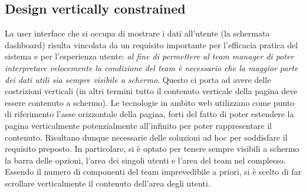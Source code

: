 \subsection{Design vertically constrained}
La user interface che si occupa di mostrare i dati all'utente (la schermata dashboard) risulta vincolata da un requisito importante per l'efficacia pratica del sistema e per l'esperienza utente: \emph{al fine di permettere al team manager di poter interpretare velocemente la condizione del team è necessario che la maggior parte dei dati utili sia sempre visibile a schermo}.\newline
Questo ci porta ad avere delle costrizioni verticali (in altri termini tutto il contenuto verticale della pagina deve essere contenuto a schermo).\newline
Le tecnologie in ambito web utilizzano come punto di riferimento l'asse orizzontale della pagina, forti del fatto di poter estendere la pagina verticalmente potenzialmente all'infinito per poter rappresentare il contenuto.\newline
Risultano dunque necessarie delle soluzioni ad hoc per soddisfare il requisito preposto.\newline
In particolare, si è optato per tenere sempre visibili a schermo la barra delle opzioni, l'area dei singoli utenti e l'area del team nel complesso. Essendo il numero di componenti del team imprevedibile a priori, si è scelto di far scrollare verticalmente il contenuto dell'area degli utenti.
